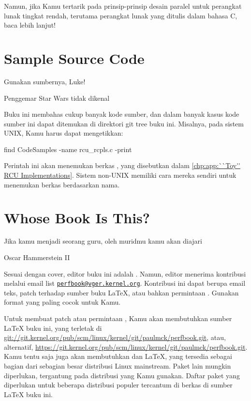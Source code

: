 Namun, jika Kamu tertarik pada prinsip-prinsip desain paralel
untuk perangkat lunak tingkat rendah, terutama perangkat lunak yang ditulis
dalam bahasa C, baca lebih lanjut!

\section{Sample Source Code}
\label{sec:howto:Sample Source Code}
%
\epigraph{Gunakan sumbernya, Luke!}{Penggemar Star Wars tidak dikenal}

Buku ini membahas cukup banyak kode sumber, dan dalam banyak kasus
kode sumber ini dapat ditemukan di direktori 
git tree buku ini.
Misalnya, pada sistem UNIX, Kamu harus dapat mengetikkan:

\begin{VerbatimU}
find CodeSamples -name rcu_rcpls.c -print
\end{VerbatimU}

Perintah ini akan menemukan berkas , yang disebutkan dalam
\cref{chp:app:``Toy'' RCU Implementations}\@.
Sistem non-UNIX memiliki cara mereka sendiri untuk menemukan berkas berdasarkan nama.

\section{Whose Book Is This?}
\label{sec:howto:Whose Book Is This?}
%
\epigraph{Jika kamu menjadi seorang guru, oleh muridmu kamu akan diajari}
	 {Oscar Hammerstein II}

Sesuai dengan cover, editor buku ini adalah .
Namun, editor menerima kontribusi melalui email list
\href{mailto:perfbook@vger.kernel.org}
{\nolinkurl{perfbook@vger.kernel.org}}.
Kontribusi ini dapat berupa email teks, patch terhadap sumber buku \LaTeX{},
atau bahkan permintaan .
Gunakan format yang paling cocok untuk Kamu.

Untuk membuat patch atau permintaan , Kamu akan membutuhkan
sumber \LaTeX{} buku ini, yang terletak di
\url{git://git.kernel.org/pub/scm/linux/kernel/git/paulmck/perfbook.git},
atau, alternatif,
\url{https://git.kernel.org/pub/scm/linux/kernel/git/paulmck/perfbook.git}.
Kamu tentu saja juga akan membutuhkan  dan \LaTeX{}, yang tersedia
sebagai bagian dari sebagian besar distribusi Linux mainstream.
Paket lain mungkin diperlukan, tergantung pada distribusi yang Kamu gunakan.
Daftar paket yang diperlukan untuk beberapa distribusi populer tercantum
di berkas  di sumber \LaTeX{} buku ini.

